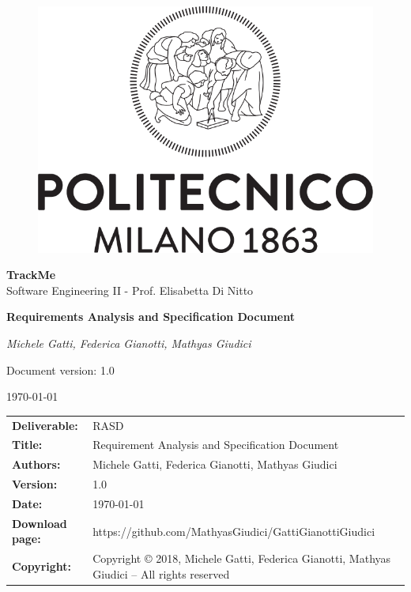 \documentclass[a4paper,12pt]{report}
\begin{document}
\begin{titlepage}
\centering
	\begin{center}{
		\begin{figure}[h]
		\large
		\centering
		{\includegraphics[width=.60\linewidth]{img/logo_poli}}
        \end{figure}
    	}
	\end{center}
	\vspace{1 cm}
	{\Large {\textbf{\LARGE TrackMe} \\
		Software Engineering II - Prof. Elisabetta Di Nitto} \par}
	\vspace{1.5cm}
	{\LARGE \textbf{Requirements Analysis and Specification Document} \par}
	\vspace{1.5cm}
	{\Large\itshape Michele Gatti, Federica Gianotti, Mathyas Giudici\par}
	\vspace{2cm}
	\vfill
	{\large Document version: 1.0\par}
	{\large \today \par}
\end{titlepage}

{
\begin{table}[h!]
\begin{tabu} to \textwidth { X[0.3,r,p] X[0.7,l,p] }
\textbf{Deliverable:} & RASD\\
\textbf{Title:} & Requirement Analysis and Specification Document \\
\textbf{Authors:} & Michele Gatti, Federica Gianotti, Mathyas Giudici \\
\textbf{Version:} & 1.0 \\
\textbf{Date:} & \today \\
\textbf{Download page:} & https://github.com/MathyasGiudici/GattiGianottiGiudici \\
\textbf{Copyright:} & Copyright © 2018, Michele Gatti, Federica Gianotti, Mathyas Giudici – All rights reserved \\
\end{tabu}
\end{table}

\setcounter{page}{2}
}
\end{document}
